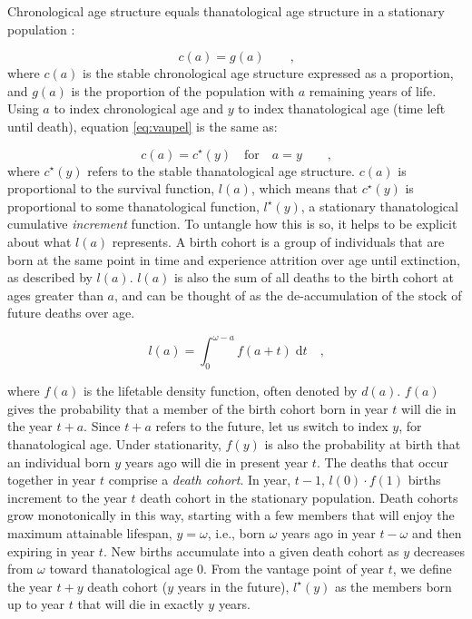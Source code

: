 \documentclass{article}
\newcommand{\dd}{\; \mathrm{d}}
\begin{document}
Chronological age structure equals thanatological age structure in a stationary
population \citep{brouard1989mouvements,vaupel2009life,rao2014generalization}:

\begin{equation}
\label{eq:vaupel}
c(a) = g(a) \quad\quad \text{,}
\end{equation}
where $c(a)$ is the stable chronological age structure expressed as a
proportion, and $g(a)$ is the proportion of the population with $a$ remaining
years of life. Using $a$ to index chronological age and $y$ to index
thanatological age (time left until death), equation \eqref{eq:vaupel} is the
same as:

\begin{equation}
\label{eq:equivalent}
c(a) = c^\star (y) \quad \text{for}\quad a = y \quad\quad\text{,}
\end{equation}
where $c^\star (y)$ refers to the stable thanatological age
structure. $c(a)$ is proportional to the survival
function, $l(a)$, which means that $c^\star(y)$ is proportional to some
thanatological function, $l^\star (y)$, a stationary thanatological cumulative
\textit{increment} function. To untangle how this is so, it helps to be
explicit about what $l(a)$ represents. A birth cohort is a
group of individuals that are born at the same point in time and experience attrition over age until extinction, as described by $l(a)$. $l(a)$ is also
the sum of all deaths to the birth cohort at ages greater than $a$, and can be
thought of as the de-accumulation of the stock of future deaths over age. 

\begin{equation}
\label{eq:la}
l(a) = \int _{0}^{\omega-a} f(a+t) \dd t \quad \text{,}
\end{equation}

\noindent where $f(a)$ is the lifetable density function, often denoted by
$d(a)$. $f(a)$ gives the probability that a member of the birth cohort born in year $t$
will die in the year $t+a$. Since $t+a$ refers to the future,
let us switch to index $y$, for thanatological age. Under
stationarity, $f(y)$ is also the probability at birth that an individual born
$y$ years ago will die in present year $t$. The deaths that occur together in
year $t$ comprise a \textit{death cohort}. In year, $t-1$, $l(0)\cdot f(1)$ births increment to the year $t$ death cohort in the stationary population. Death cohorts grow monotonically in this way, starting
with a few members that will enjoy the maximum attainable lifespan, $ y =
\omega$, i.e., born $\omega$ years ago in year $t-\omega$ and then expiring in
year $t$. New births accumulate into a given death cohort as $y$ decreases from
$\omega$ toward thanatological age 0. From the vantage point of year
$t$, we define the year $t+y$ death cohort ($y$ years in the future), $l^\star
(y)$ as the members born up to year $t$ that will die in exactly $y$ years. 
\end{document}
